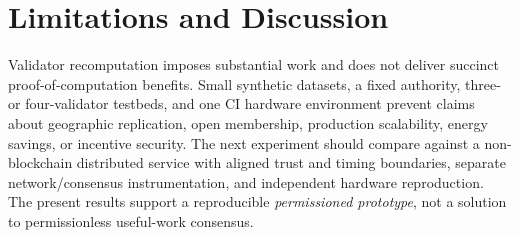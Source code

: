 \documentclass[sigconf,anonymous]{acmart}
\begin{document}
\section{Limitations and Discussion}
Validator recomputation imposes substantial work and does not deliver succinct proof-of-computation benefits. Small synthetic datasets, a fixed authority, three- or four-validator testbeds, and one CI hardware environment prevent claims about geographic replication, open membership, production scalability, energy savings, or incentive security. The next experiment should compare against a non-blockchain distributed service with aligned trust and timing boundaries, separate network/consensus instrumentation, and independent hardware reproduction. The present results support a reproducible \emph{permissioned prototype}, not a solution to permissionless useful-work consensus.



\end{document}
